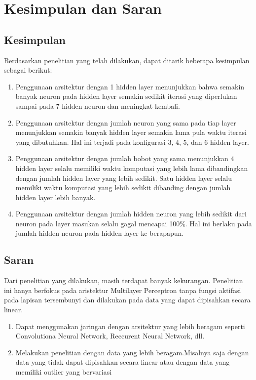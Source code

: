 \chapter{Kesimpulan dan Saran}

\section{Kesimpulan}

Berdasarkan penelitian yang telah dilakukan, dapat ditarik beberapa kesimpulan sebagai berikut:
\begin{enumerate}
    \item Penggunaan arsitektur dengan 1 hidden layer menunjukkan bahwa semakin banyak neuron pada hidden layer semakin sedikit iterasi yang diperlukan sampai pada 7 hidden neuron dan meningkat kembali.
    \item Penggunaan arsitektur dengan jumlah neuron yang sama pada tiap layer menunjukkan semakin banyak hidden layer semakin lama pula waktu iterasi yang dibutuhkan. Hal ini terjadi pada konfigurasi 3, 4, 5, dan 6 hidden layer.
    \item Penggunaan arsitektur dengan jumlah bobot yang sama menunjukkan 4 hidden layer selalu memiliki waktu komputasi yang lebih lama dibandingkan dengan jumlah hidden layer yang lebih sedikit. Satu hidden layer selalu memiliki waktu komputasi yang lebih sedikit dibanding dengan jumlah hidden layer lebih banyak. 
    \item Penggunaan arsitektur dengan jumlah hidden neuron yang lebih sedikit dari neuron pada layer masukan selalu gagal mencapai 100\%. Hal ini berlaku pada jumlah hidden neuron pada hidden layer ke berapapun.
\end{enumerate}

\section{Saran}

Dari penelitian yang dilakukan, masih terdapat banyak kekurangan. Penelitian ini hanya berfokus pada aristektur Multilayer Perceptron tanpa fungsi aktifasi pada lapisan tersembunyi dan dilakukan pada data yang dapat dipisahkan secara linear.   

\begin{enumerate}
    \item Dapat menggunakan jaringan dengan arsitektur yang lebih beragam seperti Convolutiona Neural Network, Reccurent Neural Network, dll.

    \item Melakukan penelitian dengan data yang lebih beragam.Misalnya saja dengan data yang tidak dapat dipisahkan secara linear atau dengan data yang memiliki outlier yang bervariasi


\end{enumerate}
